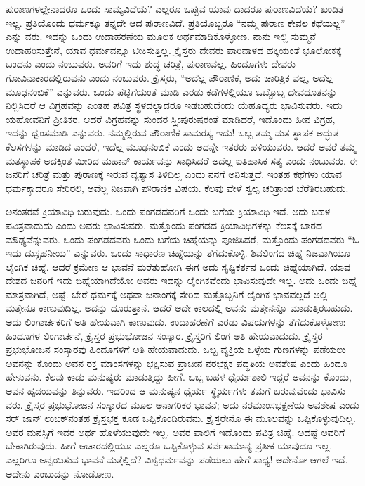 ಪುರಾಣಗಳಲ್ಲೇನಾದರೂ ಒಂದು ಸಾಮ್ಯವಿದೆಯೆ? ಎಲ್ಲರೂ ಒಪ್ಪುವ ಯಾವು ದಾದರೂ ಪುರಾಣವಿದೆಯೆ? ಖಂಡಿತ ಇಲ್ಲ. ಪ್ರತಿಯೊಂದು ಧರ್ಮಕ್ಕೂ ತನ್ನದೇ ಆದ ಪುರಾಣವಿದೆ. ಪ್ರತಿಯೊಬ್ಬರೂ “ನಮ್ಮ ಪುರಾಣ ಕೇವಲ ಕಥೆಯಲ್ಲ” ಎನ್ನು ವರು. ಇದನ್ನು ಒಂದು ಉದಾಹರಣೆಯ ಮೂಲಕ ಅರ್ಥಮಾಡಿಕೊಳ್ಳೋಣ. ನಾನು ಇಲ್ಲಿ ಸುಮ್ಮನೆ ಉದಾಹರಿಸುತ್ತೇನೆ, ಯಾವ ಧರ್ಮವನ್ನೂ ಟೀಕಿಸುತ್ತಿಲ್ಲ. ಕ್ರೈಸ್ತರು ದೇವರು ಪಾರಿವಾಳದ ಹಕ್ಕಿಯಂತೆ ಭೂಲೋಕಕ್ಕೆ ಬಂದನು ಎಂದು ನಂಬುವರು. ಅವರಿಗೆ ಇದು ಶುದ್ಧ ಚರಿತ್ರೆ, ಪುರಾಣವಲ್ಲ. ಹಿಂದೂಗಳು ದೇವರು ಗೋವಿನಾಕಾರದಲ್ಲಿರುವನು ಎಂದು ನಂಬುವರು. ಕ್ರೈಸ್ತರು, “ಅದೆಲ್ಲ ಪೌರಾಣಿಕ, ಅದು ಚಾರಿತ್ರಿಕ ವಲ್ಲ, ಅದೆಲ್ಲ ಮೂಢನಂಬಿಕೆ” ಎನ್ನುವರು. ಒಂದು ಪೆಟ್ಟಿಗೆಯಂತೆ ಮಾಡಿ ಎರಡು ಕಡೆಗಳಲ್ಲಿಯೂ ಒಬ್ಬೊಬ್ಬ ದೇವದೂತನನ್ನು ನಿಲ್ಲಿಸಿದರೆ ಆ ವಿಗ್ರಹವನ್ನು ಎಂತಹ ಪವಿತ್ರ ಸ್ಥಳದಲ್ಲಾದರೂ ಇಡಬಹುದೆಂದು ಯೆಹೂದ್ಯರು ಭಾವಿಸುವರು. ಇದು ಯಹೋವನಿಗೆ ಪ್ರೀತಿಕರ. ಆದರೆ ವಿಗ್ರಹವನ್ನು ಸುಂದರ ಸ್ತ್ರೀಪುರುಷರಂತೆ ಮಾಡಿದರೆ, ಇದೊಂದು ಹೀನ ವಿಗ್ರಹ, ಇದನ್ನು ಧ್ವಂಸಮಾಡಿ ಎನ್ನುವರು. ನಮ್ಮಲ್ಲಿರುವ ಪೌರಾಣಿಕ ಸಾಮರಸ್ಯ ಇದು! ಒಬ್ಬ ತಮ್ಮ ಮತ ಸ್ಥಾಪಕ ಅದ್ಭುತ ಕೆಲಸಗಳನ್ನು ಮಾಡಿದ ಎಂದರೆ, ಇದೆಲ್ಲ ಮೂಢನಂಬಿಕೆ ಎಂದು ಅದನ್ನೇ ಇತರರು ಹಳಿಯುವರು. ಆದರೆ ಅವರೆ ತಮ್ಮ ಮತಸ್ಥಾಪಕ ಅದಕ್ಕಿಂತ ಮೀರಿದ ಮಹಾನ್​ ಕಾರ್ಯವನ್ನು ಸಾಧಿಸಿದರೆ ಅದೆಲ್ಲ ಐತಿಹಾಸಿಕ ಸತ್ಯ ಎಂದು ನಂಬುವರು. ಈ ಜನರಿಗೆ ಚರಿತ್ರೆ ಮತ್ತು ಪುರಾಣಕ್ಕೆ ಇರುವ ವ್ಯತ್ಯಾಸ ತಿಳಿದಿಲ್ಲ ಎಂದು ನನಗೆ ಅನಿಸುತ್ತದೆ. ಇಂತಹ ಕಥೆಗಳು ಯಾವ ಧರ್ಮಕ್ಕಾದರೂ ಸೇರಿರಲಿ, ಅವೆಲ್ಲ ನಿಜವಾಗಿ ಪೌರಾಣಿಕ ವಿಷಯ. ಕೆಲವು ವೇಳೆ ಸ್ವಲ್ಪ ಚರಿತ್ರಾಂಶ ಬೆರೆತಿರಬಹುದು.

ಅನಂತರವೆ ಕ್ರಿಯಾವಿಧಿ ಬರುವುದು. ಒಂದು ಪಂಗಡದವರಿಗೆ ಒಂದು ಬಗೆಯ ಕ್ರಿಯಾವಿಧಿ ಇದೆ. ಅದು ಬಹಳ ಪವಿತ್ರವಾದುದು ಎಂದು ಅವರು ಭಾವಿಸುವರು. ಮತ್ತೊಂದು ಪಂಗಡದ ಕ್ರಿಯಾವಿಧಿಗಳನ್ನು ಕೆಲಸಕ್ಕೆ ಬಾರದ ಮೌಢ್ಯವೆನ್ನುವರು. ಒಂದು ಪಂಗಡದವರು ಒಂದು ಬಗೆಯ ಚಿಹ್ನೆಯನ್ನು ಪೂಜಿಸಿದರೆ, ಮತ್ತೊಂದು ಪಂಗಡದವರು “ಓ ಇದು ದುಸ್ಸಹನೀಯ” ಎನ್ನುವರು. ಒಂದು ಸಾಧಾರಣ ಚಿಹ್ನೆಯನ್ನು ತೆಗೆದುಕೊಳ್ಳಿ. ಶಿವಲಿಂಗದ ಚಿಹ್ನೆ ನಿಜವಾಗಿಯೂ ಲೈಂಗಿಕ ಚಿಹ್ನೆ. ಆದರೆ ಕ್ರಮೇಣ ಆ ಭಾವನೆ ಮರೆತುಹೋಗಿ ಈಗ ಅದು ಸೃಷ್ಟಿಕರ್ತನ ಒಂದು ಚಿಹ್ನೆಯಾಗಿದೆ. ಯಾವ ದೇಶದ ಜನರಿಗೆ ಇದು ಚಿಹ್ನೆಯಾಗಿದೆಯೋ ಅವರು ಇದನ್ನು ಲೈಂಗಿಕವೆಂದು ಭಾವಿಸುವುದೇ ಇಲ್ಲ. ಅದು ಒಂದು ಚಿಹ್ನೆ ಮಾತ್ರವಾಗಿದೆ, ಅಷ್ಟೆ. ಬೇರೆ ಧರ್ಮಕ್ಕೆ ಅಥವಾ ಜನಾಂಗಕ್ಕೆ ಸೇರಿದ ಮತ್ತೊಬ್ಬನಿಗೆ ಲೈಂಗಿಕ ಭಾವವಲ್ಲದೆ ಅಲ್ಲಿ ಮತ್ತೇನೂ ಕಾಣುವುದಿಲ್ಲ. ಅದನ್ನು ದೂರುತ್ತಾನೆ. ಆದರೆ ಅದೇ ಕಾಲದಲ್ಲಿ ಅವನು ಮತ್ತೇನನ್ನೊ ಮಾಡುತ್ತಿರಬಹುದು. ಅದು ಲಿಂಗಾರ್ಚಕರಿಗೆ ಅತಿ ಹೇಯವಾಗಿ ಕಾಣುವುದು. ಉದಾಹರಣೆಗೆ ಎರಡು ವಿಷಯಗಳನ್ನು ತೆಗೆದುಕೊಳ್ಳೋಣ: ಹಿಂದೂಗಳ ಲಿಂಗಾರ್ಚನೆ, ಕ್ರೈಸ್ತರ ಪ್ರಭುಭೋಜನ ಸಂಸ್ಕಾರ. ಕ್ರೈಸ್ತರಿಗೆ ಲಿಂಗ ಅತಿ ಹೇಯವಾದುದು. ಕ್ರೈಸ್ತರ ಪ್ರಭುಭೋಜನ ಸಂಸ್ಕಾರವು ಹಿಂದೂಗಳಿಗೆ ಅತಿ ಹೇಯವಾದುದು. ಒಬ್ಬ ವ್ಯಕ್ತಿಯ ಒಳ್ಳೆಯ ಗುಣಗಳನ್ನು ಪಡೆಯಲು ಅವನನ್ನು ಕೊಂದು ಅವನ ರಕ್ತ ಮಾಂಸಗಳನ್ನು ಭಕ್ಷಿಸುವ ಪ್ರಾಚೀನ ನರಭಕ್ಷಕ ಪದ್ಧತಿಯ ಅವಶೇಷ ಎಂದು ಹಿಂದೂ ಹೇಳುವನು. ಕೆಲವು ಕಾಡು ಮನುಷ್ಯರು ಮಾಡುತ್ತಿದ್ದು ಹೀಗೆ. ಒಬ್ಬ ಬಹಳ ಧೈರ್ಯಶಾಲಿ ಇದ್ದರೆ ಅವನನ್ನು ಕೊಂದು, ಅವನ ಹೃದಯವನ್ನು ತಿನ್ನುವರು. ಇದರಿಂದ ಆ ಮನುಷ್ಯನ ಧೈರ್ಯ ಸ್ಥೈರ್ಯಗಳು ತಮಗೆ ಬರುವುವೆಂದು ಭಾವಿಸು ವರು. ಕ್ರೈಸ್ತರ ಪ್ರಭುಭೋಜನ ಸಂಸ್ಕಾರದ ಮೂಲ ಅನಾಗರಿಕರ ಭಾವನೆ; ಅದು ನರಮಾಂಸಭಕ್ಷಣೆಯ ಅವಶೇಷ ಎಂದು ಸರ್​ ಜಾನ್​ ಲುಬಕ್​ನಂತಹ ಕ್ರೈಸ್ತಭಕ್ತ ಕೂಡ ಒಪ್ಪಿಕೊಂಡಿರುವನು. ಕ್ರೈಸ್ತರೇನೊ ಈ ಮೂಲವನ್ನು ಒಪ್ಪಿಕೊಳ್ಳುವುದಿಲ್ಲ. ಅವರ ಮನಸ್ಸಿಗೆ ಇದರ ಅರ್ಥ ಹೊಳೆಯುವುದೇ ಇಲ್ಲ. ಅವರ ಪಾಲಿಗೆ ಇದೊಂದು ಪವಿತ್ರ ಚಿಹ್ನೆ. ಅದಷ್ಟೆ ಅವರಿಗೆ ಬೇಕಾಗಿರುವುದು. ಹೀಗೆ ಆಚಾರದಲ್ಲಿಯೂ ಎಲ್ಲರೂ ಒಪ್ಪಿಕೊಳ್ಳುವ ಸರ್ವಸಾಮಾನ್ಯ ಪ್ರತೀಕ ಯಾವುದೂ ಇಲ್ಲ. ಎಲ್ಲರಿಗೂ ಅನ್ವಯಿಸುವ ಭಾವನೆ ಮತ್ತೆಲ್ಲಿದೆ? ವಿಶ್ವಧರ್ಮವನ್ನು ಪಡೆಯಲು ಹೇಗೆ ಸಾಧ್ಯ! ಅದೇನೋ ಆಗಲೆ ಇದೆ. ಅದೇನು ಎಂಬುದನ್ನು ನೋಡೋಣ.

